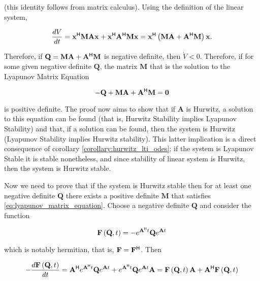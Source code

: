 	\noindent (this identity follows from matrix calculus). Using the definition of the linear system,

\begin{equation} \dfrac{dV}{dt} = \mathbf{x}^{\mathsf{H}} \mathbf{M} \mathbf{Ax} + \mathbf{x}^{\mathsf{H}}\mathbf{A}^{\mathsf{H}} \mathbf{M}\mathbf{x}  = \mathbf{x}^{\mathsf{H}}\left(\mathbf{M} \mathbf{A} + \mathbf{A}^{\mathsf{H}}\mathbf{M}\right)\mathbf{x} .\end{equation} 

	Therefore, if $\mathbf{Q} = \mathbf{M} \mathbf{A} + \mathbf{A}^{\mathsf{H}}\mathbf{M}$ is negative definite, then $\dot{V} < 0$. Therefore, if for some given negative definite $\mathbf{Q}$, the matrix $\mathbf{M}$ that is the solution to the Lyapunov Matrix Equation
	
\begin{equation}  -\mathbf{Q} + \mathbf{M} \mathbf{A} + \mathbf{A}^{\mathsf{H}}\mathbf{M} = \mathbf{0} \label{eq:lyapunov_matrix_equation}\end{equation}

	\noindent is positive definite. The proof now aims to show that if $\mathbf{A}$ is Hurwitz, a solution to this equation can be found (that is, Hurwitz Stability implies Lyapunov Stability) and that, if a solution can be found, then the system is Hurwitz (Lyapunov Stability implies Hurwitz stability). This latter implication is a direct consequence of corollary \ref{corollary:hurwitz_lti_odes}; if the system is Lyapunov Stable it is stable nonetheless, and since stability of linear system is Hurwitz, then the system is Hurwitz stable.

	Now we need to prove that if the system is Hurwitz stable then for at least one negative definite $\mathbf{Q}$ there exists a positive definite $\mathbf{M}$ that satisfies \eqref{eq:lyapunov_matrix_equation}. Choose a negative definite $\mathbf{Q}$ and consider the function

\begin{equation} \mathbf{F}\left(\mathbf{Q},t\right) = -e^{\mathbf{A}^{\mathsf{H}} t}\mathbf{Q}e^{\mathbf{A} t} \label{eq:def_f_func}\end{equation}

	\noindent which is notably hermitian, that is, $\mathbf{F} = \mathbf{F}^{\mathsf{H}}$. Then

\begin{equation} -\dfrac{d\mathbf{F}\left(\mathbf{Q},t\right)}{dt} = \mathbf{A}^{\mathsf{H}} e^{\mathbf{A}^{\mathsf{H}} t}\mathbf{Q}e^{\mathbf{A} t} + e^{\mathbf{A}^{\mathsf{H}} t}\mathbf{Q}e^{\mathbf{A} t}\mathbf{A} = \mathbf{F}\left(\mathbf{Q},t\right)\mathbf{A} + \mathbf{A}^{\mathsf{H}}\mathbf{F}\left(\mathbf{Q},t\right) \end{equation}

